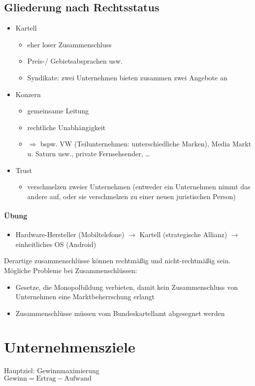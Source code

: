 \documentclass{scrreprt}
\begin{document}
\subsection{Gliederung nach Rechtsstatus}
\begin{itemize}
\item Kartell
\begin{itemize}
\item eher loser Zusammenschluss
\item Preis-/ Gebietsabsprachen usw.
\item Syndikate: zwei Unternehmen bieten zusammen zwei Angebote an
\end{itemize}
\item Konzern
\begin{itemize}
\item gemeinsame Leitung
\item rechtliche Unabhängigkeit
\item $\Rightarrow$ bspw. VW (Teilunternehmen: unterschiedliche Marken), Media Markt u. Saturn usw.,  private Fernsehsender, …
\end{itemize}
\item Trust
\begin{itemize}
\item verschmelzen zweier Unternehmen (entweder ein Unternehmen nimmt das andere auf, oder sie verschmelzen zu einer neuen juristischen Person)
\end{itemize}
\end{itemize}
\paragraph{Übung} 
\begin{itemize}
\item Hardware-Hersteller (Mobiltelefone) $\to$ Kartell (strategische Allianz) $\to$ einheitliches OS (Android)
\end{itemize}
Derartige zusammenschlüsse können rechtmäßig und nicht-rechtmäßig sein.
Mögliche Probleme bei Zusammenschlüssen:
\begin{itemize}
\item Gesetze, die Monopolbildung verbieten, damit kein Zusammenschluss von Unternehmen eine Marktbeherrschung erlangt
\item Zusammenschlüsse müssen vom Bundeskartellamt abgesegnet werden
\end{itemize}

\section{Unternehmensziele}
Hauptziel: Gewinnmaximierung\\
$\text{Gewinn} = \text{Ertrag} - \text{Aufwand}$
\end{document}
